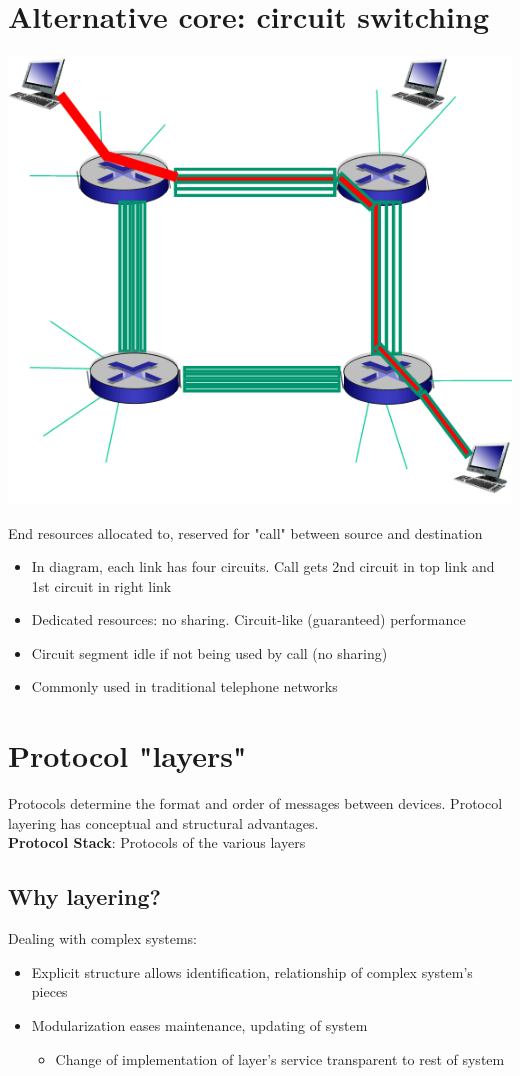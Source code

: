\documentclass{article}[18pt]
\begin{document}
\section{Alternative core: circuit switching}
\begin{center}
	\includegraphics[scale=0.7]{circuit_switching}
\end{center}
End resources allocated to, reserved for "call" between source and destination
\begin{itemize}
	\item In diagram, each link has four circuits. Call gets 2nd circuit in top link and 1st circuit in right link
	\item Dedicated resources: no sharing. Circuit-like (guaranteed) performance
	\item Circuit segment idle if not being used by call (no sharing)
	\item Commonly used in traditional telephone networks
\end{itemize}
\section{Protocol "layers"}
Protocols determine the format and order of messages between devices. Protocol layering has conceptual and structural advantages.\\
\textbf{Protocol Stack}: Protocols of the various layers
\subsection{Why layering?}
Dealing with complex systems:
\begin{itemize}
	\item Explicit structure allows identification, relationship of complex system's pieces
	\item Modularization eases maintenance, updating of system
	\begin{itemize}
		\item Change of implementation of layer's service transparent to rest of system
	\end{itemize}
\end{itemize}
\end{document}
